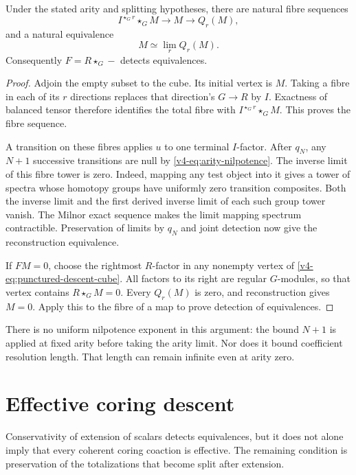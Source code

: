 \begin{theorem}
\label{v4-thm:ordered-reconstruction}
Under the stated arity and splitting hypotheses, there are natural
fibre sequences
\[
 I^{\star_G r}\star_G M\longrightarrow M\longrightarrow Q_r(M),
\]
and a natural equivalence
\[
 M\simeq\lim_r Q_r(M).
\]
Consequently \(F=R\star_G-\) detects equivalences.
\end{theorem}

\begin{proof}
Adjoin the empty subset to the cube. Its initial vertex is \(M\).
Taking a fibre in each of its \(r\) directions replaces that
direction's \(G\to R\) by \(I\). Exactness of balanced tensor
therefore identifies the total fibre with
\(I^{\star_G r}\star_G M\). This proves the fibre sequence.

A transition on these fibres applies \(u\) to one terminal
\(I\)-factor. After \(q_N\), any \(N+1\) successive transitions
are null by \eqref{v4-eq:arity-nilpotence}.
The inverse limit of this fibre tower is zero.
Indeed, mapping any test object into it gives a tower of spectra
whose homotopy groups have uniformly zero transition composites.
Both the inverse limit and the first derived inverse limit of
each such group tower vanish. The Milnor exact sequence makes
the limit mapping spectrum contractible.
Preservation of limits by \(q_N\) and joint detection now give
the reconstruction equivalence.

If \(FM=0\), choose the rightmost \(R\)-factor in any nonempty
vertex of \eqref{v4-eq:punctured-descent-cube}.
All factors to its right are regular \(G\)-modules, so that
vertex contains \(R\star_G M=0\). Every \(Q_r(M)\) is zero,
and reconstruction gives \(M=0\).
Apply this to the fibre of a map to prove detection of
equivalences.
\end{proof}

There is no uniform nilpotence exponent in this argument:
the bound \(N+1\) is applied at fixed arity before taking the
arity limit. Nor does it bound coefficient resolution length.
That length can remain infinite even at arity zero.

\section{Effective coring descent}
\label{v4-sec:effective-coring-descent}

Conservativity of extension of scalars detects equivalences, but it does
not alone imply that every coherent coring coaction is effective.
The remaining condition is preservation of the totalizations
that become split after extension.

